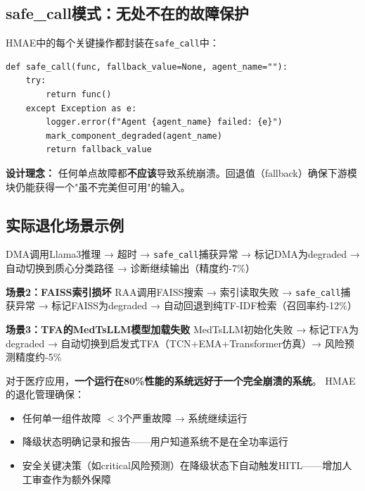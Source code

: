 \documentclass[11pt,a4paper]{ctexart}
\begin{document}
\subsection{safe\_call模式：无处不在的故障保护}

HMAE中的每个关键操作都封装在\texttt{safe\_call}中：

\begin{codebox}
\begin{verbatim}
def safe_call(func, fallback_value=None, agent_name=""):
    try:
        return func()
    except Exception as e:
        logger.error(f"Agent {agent_name} failed: {e}")
        mark_component_degraded(agent_name)
        return fallback_value
\end{verbatim}
\end{codebox}

\textbf{设计理念：} 任何单点故障都\textbf{不应该}导致系统崩溃。回退值（fallback）确保下游模块仍能获得一个"虽不完美但可用"的输入。

\subsection{实际退化场景示例}

\begin{exambox}[场景1：Ollama服务宕机]
DMA调用Llama3推理 → 超时 → \texttt{safe\_call}捕获异常 → 标记DMA为degraded → 自动切换到质心分类路径 → 诊断继续输出（精度约-7\%）

\textbf{场景2：FAISS索引损坏}
RAA调用FAISS搜索 → 索引读取失败 → \texttt{safe\_call}捕获异常 → 标记FAISS为degraded → 自动回退到纯TF-IDF检索（召回率约-12\%）

\textbf{场景3：TFA的MedTsLLM模型加载失败}
MedTsLLM初始化失败 → 标记TFA为degraded → 自动切换到启发式TFA（TCN+EMA+Transformer仿真）→ 风险预测精度约-5\%
\end{exambox}

\begin{keybox}
对于医疗应用，\textbf{一个运行在80\%性能的系统远好于一个完全崩溃的系统}。
HMAE的退化管理确保：
\begin{itemize}[nosep]
\item 任何单一组件故障 $< 3$个严重故障 → 系统继续运行
\item 降级状态明确记录和报告——用户知道系统不是在全功率运行
\item 安全关键决策（如critical风险预测）在降级状态下自动触发HITL——增加人工审查作为额外保障
\end{itemize}
\end{keybox}
\end{document}
